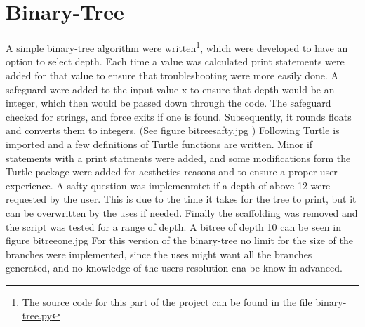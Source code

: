 \documentclass[titlepage]{article}
\begin{document}
\section{Binary-Tree}
A simple binary-tree algorithm were written\footnote{The source code for this part of the project can be found in the file \href{https://github.com/ErikAndersen81/DM550-FractalProject/blob/master/Working_binary_tree.py}{binary-tree.py}}, which were developed to have an option to select depth. Each time a value was calculated print statements were added for that value to ensure that troubleshooting were more easily done.  A safeguard were added to the input value x to ensure that depth would be an integer, which then would be passed down through the code. The safeguard checked for strings, and force exits if one is found. Subsequently, it rounds floats and converts them to integers. (See figure bitreesafty.jpg )
Following Turtle is imported and a few definitions of Turtle functions are written. 
Minor if statements with a print statments were added, and some modifications form the Turtle package were added for aesthetics reasons and to ensure a proper user experience. A safty question was implemenmtet if a depth of above 12 were requested by the user. This is due to the time it takes for the tree to print, but it can be overwritten by the uses if needed.  Finally the scaffolding was removed and the script was tested for a range of depth. A bitree of depth 10 can be seen in figure bitreeone.jpg
For this version of the binary-tree no limit for the size of the branches were implemented, since the uses might want all the branches generated, and no knowledge of the users resolution cna be know in advanced. 
\end{document}
